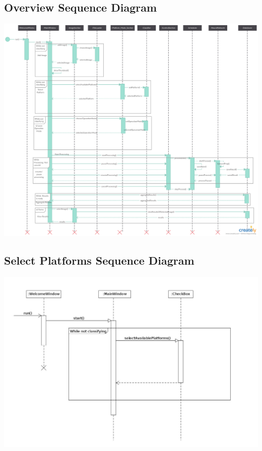 \documentclass[parskip=full]{scrartcl}
\begin{document}
\begin{itemize}
\subsection {Overview Sequence Diagram}

\begin{center}
\includegraphics[width=1.0\textwidth]{seq.Diag.png}
\end{center}

\pagebreak

\subsection {Select Platforms Sequence Diagram}

\begin{center}
\includegraphics[width=1.0\textwidth]{SelectPlatforms.jpg}
\end{center}


\end{itemize}
\end{document}
